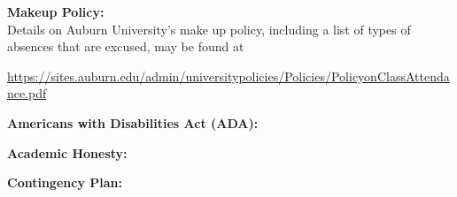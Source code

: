 \textbf{Makeup Policy:} \\
\MakeUp
Details on Auburn University's make up policy,
including a list of types of absences that are excused, may be found at\\
\centerline{\url{https://sites.auburn.edu/admin/universitypolicies/Policies/PolicyonClassAttendance.pdf}}

\textbf{Americans with Disabilities Act (ADA):}\\
\ADA

\newpage

\textbf{Academic Honesty:} \\
\AcaHon

\textbf{Contingency Plan:} \\
\ContPlan

\ExtraSections

\\

\center{\PostScript}


